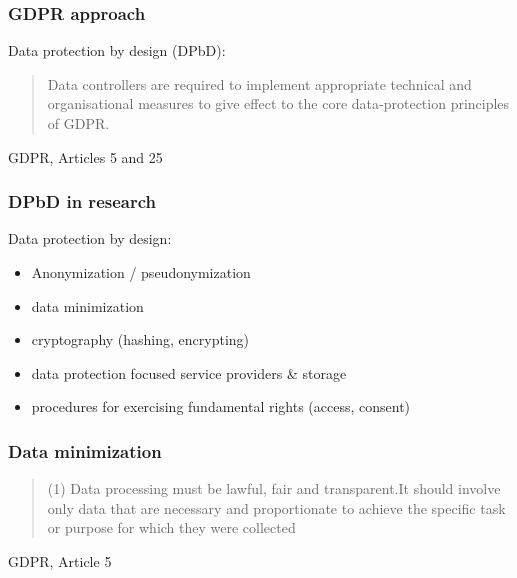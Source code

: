 \documentclass[17pt,aspectratio=169,hyperref={pdfusetitle,colorlinks,allcolors=olive}]{beamer}
\begin{document}
\begin{frame}[fragile]
  \frametitle{GDPR approach}

  Data protection by design (DPbD):\\

  \vspace{.5cm}
  \begin{quote}
    Data  controllers are required  to  implement appropriate technical and organisational measures to give effect to the core data-protection principles of GDPR.
  \end{quote}

  \begin{flushright}
  GDPR, Articles 5 and 25
  \end{flushright}
  
\end{frame}

\begin{frame}[fragile]
  \frametitle{DPbD in research}

  Data protection by design:\\

  \begin{itemize}
  \item Anonymization / pseudonymization
  \item data minimization
  \item cryptography (hashing, encrypting)
  \item data protection focused service providers \& storage
  \item procedures for exercising fundamental rights (access, consent)
  \end{itemize}
  
\end{frame}

\begin{frame}[fragile]
  \frametitle{Data minimization}

  \begin{quote}
  (1) Data  processing  must  be  lawful,  fair  and  transparent.It  should  involve  only  data  that  are  necessary  and proportionate to achieve the specific task or purpose for which they were collected
  \end{quote}

  \begin{flushright}
    GDPR, Article 5
  \end{flushright}
\end{frame}
\end{document}
